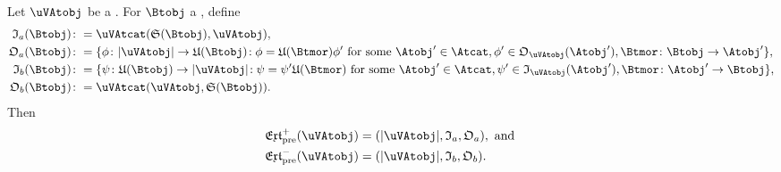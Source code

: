 \documentclass[%
12pt,%
arxiv,%
defaults
]{myclass}
\begin{document}
\begin{proposition}
\label{prop:extpre}
Let \(\uVAtobj\) be a \uVAtobj.
For \(\Btobj\) a \Btobjalt, define
%
\begin{align*}
  \itest_a(\Btobj) &\coloneqq \Hom{\uVAtcat}{\sfunc(\Btobj)}{\uVAtobj}, \\
%
  \otest_a(\Btobj) &\coloneqq \{\ofn \colon \forfunc[\uVAtobj] \to \ufunc(\Btobj)\! : \ofn = \ufunc(\Btmor)\ofn' \text{ for some } \Atobj' \in \Atcat, \ofn' \in \otest_{\uVAtobj}(\Atobj'), \Btmor \colon \Btobj \to \Atobj'\}, \\
%
  \itest_b(\Btobj) &\coloneqq \{\ifn \colon \ufunc(\Btobj) \to \forfunc[\uVAtobj]\! : \ifn = \ifn' \ufunc(\Btmor) \text{ for some } \Atobj' \in \Atcat, \ifn' \in \itest_{\uVAtobj}(\Atobj'), \Btmor \colon \Atobj' \to \Btobj\}, \\
%
  \otest_b(\Btobj) &\coloneqq \Hom{\uVAtcat}{\uVAtobj}{\sfunc(\Btobj)}.
\end{align*}
%
Then
%
\begin{align*}
\PJextfunc(\uVAtobj) &= (\forfunc[\uVAtobj], \itest_a, \otest_a), \text{ and } \\
%
\PMextfunc(\uVAtobj) &= (\forfunc[\uVAtobj], \itest_b, \otest_b).
\end{align*}
\end{proposition}
\end{document}
